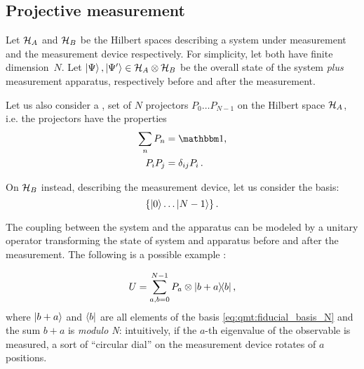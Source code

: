 \subsection{Projective measurement}\label{sec:qmt:projm}

Let $\mathcal{H}_A$ and $\mathcal{H}_B$ be the Hilbert spaces describing
a system under measurement and the measurement device respectively.
For simplicity, let both have finite di\-mension~$N$.
Let $\ket{\Psi}, \ket{\Psi'} \in \mathcal{H}_{A} \otimes \mathcal{H}_{B}$
be the overall state of the
system \emph{plus} measurement apparatus,
respectively before and after the measurement.

Let us also consider a ,  set of $N$ projectors
$P_0 \dots P_{N-1}$ on the Hilbert space $\mathcal{H}_A$,
i.e. the projectors have the properties
\begin{align}\label{eq:qmt:decomposition-id-proj}
  \sum_n P_n  &= \idop \text{,}\\
  P_i P_j     &= \delta_{ij}P_i \, \text{.}
\end{align}

On $\mathcal{H}_B$ instead, describing the measurement device, let us consider
the
basis:
\begin{equation}\label{eq:qmt:fiducial_basis_N}
  \left\{\ket{0} \dots \ket{N-1}\right\} \text{.}
\end{equation}

The coupling between the system and the apparatus
can be modeled by
a unitary operator
transforming the state of system and apparatus before and after the measurement.
The following is a possible
example \parencite[.1 ``Orthogonal Measurements'']{PreskillNotes}:

\begin{equation}\label{eq:unitary_measurement}
  U = \sum_{a, b = 0}^{N-1} P_a \otimes \ketbra{b+a}{b} \text{,}
\end{equation}
where
$\ket{b+a}$ and $\bra{b}$ are all elements of the basis \eqref{eq:qmt:fiducial_basis_N}
and
the sum $b+a$ is \emph{modulo N}:
intuitively, if the $a$-th eigenvalue of the observable is measured,
a sort of ``circular dial''
on the measurement device rotates of $a$ positions.

